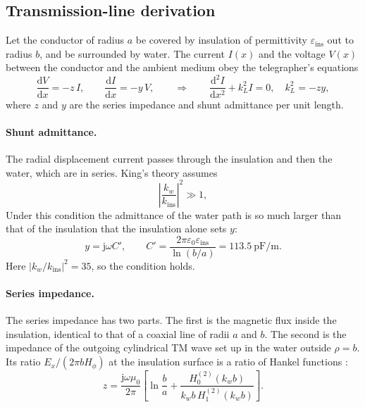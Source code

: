 \documentclass[11pt,a4paper]{article}
\newcommand{\eps}{\varepsilon}
\newcommand{\dd}{\mathrm{d}}
\newcommand{\jj}{\mathrm{j}}
\begin{document}
\subsection{Transmission-line derivation}

Let the conductor of radius $a$ be covered by insulation of permittivity $\eps_{\text{ins}}$ out to radius
$b$, and be surrounded by water. The current $I(x)$ and the voltage $V(x)$ between the conductor and the
ambient medium obey the telegrapher's equations \cite{Pozar2012}
\begin{equation}
  \frac{\dd V}{\dd x} = -z\,I, \qquad \frac{\dd I}{\dd x} = -y\,V,
  \qquad\Rightarrow\qquad \frac{\dd^2 I}{\dd x^2} + k_L^2 I = 0,\quad k_L^2 = -zy,
  \label{eq:telegraph}
\end{equation}
where $z$ and $y$ are the series impedance and shunt admittance per unit length.

\paragraph{Shunt admittance.} The radial displacement current passes through the insulation and then the
water, which are in series. King's theory assumes \cite{King1983}
\begin{equation}
  \left|\frac{k_w}{k_{\text{ins}}}\right|^2 \gg 1 ,
  \label{eq:kingcond}
\end{equation}
Under this condition the admittance of the water path is so much larger than that of the insulation that
the insulation alone sets $y$:
\begin{equation}
  y = \jj\omega C', \qquad C' = \frac{2\pi\eps_0\eps_{\text{ins}}}{\ln(b/a)} = 113.5\ \text{pF/m}.
  \label{eq:C}
\end{equation}
Here $|k_w/k_{\text{ins}}|^2=35$, so the condition holds.

\paragraph{Series impedance.} The series impedance has two parts. The first is the magnetic flux inside the
insulation, identical to that of a coaxial line of radii $a$ and $b$. The second is the impedance of the
outgoing cylindrical TM wave set up in the water outside $\rho=b$. Its ratio $E_x/(2\pi b H_\phi)$ at the
insulation surface is a ratio of Hankel functions \cite{King1983,KingSmith1981}:
\begin{equation}
  z = \frac{\jj\omega\mu_0}{2\pi}\left[\ln\frac{b}{a} +
      \frac{H^{(2)}_0(k_w b)}{k_w b\,H^{(2)}_1(k_w b)}\right].
  \label{eq:z}
\end{equation}
\end{document}
